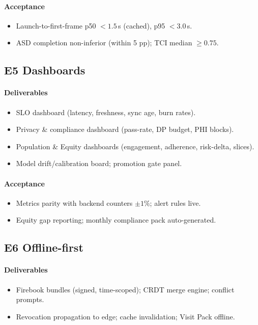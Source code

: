 \documentclass[11pt]{article}
\theoremstyle{plain}
\begin{document}
\paragraph{Acceptance}
\begin{itemize}
  \item Launch-to-first-frame p50 $<1.5$\,s (cached), p95 $<3.0$\,s.
  \item ASD completion non-inferior (within 5 pp); TCI median $\ge 0.75$.
\end{itemize}

\subsection{E5 Dashboards}
\paragraph{Deliverables}
\begin{itemize}
  \item SLO dashboard (latency, freshness, sync age, burn rates).
  \item Privacy \& compliance dashboard (pass-rate, DP budget, PHI blocks).
  \item Population \& Equity dashboards (engagement, adherence, risk-delta, slices).
  \item Model drift/calibration board; promotion gate panel.
\end{itemize}
\paragraph{Acceptance}
\begin{itemize}
  \item Metrics parity with backend counters $\pm1\%$; alert rules live.
  \item Equity gap reporting; monthly compliance pack auto-generated.
\end{itemize}

\subsection{E6 Offline-first}
\paragraph{Deliverables}
\begin{itemize}
  \item Firebook bundles (signed, time-scoped); CRDT merge engine; conflict prompts.
  \item Revocation propagation to edge; cache invalidation; Visit Pack offline.
\end{itemize}
\end{document}
